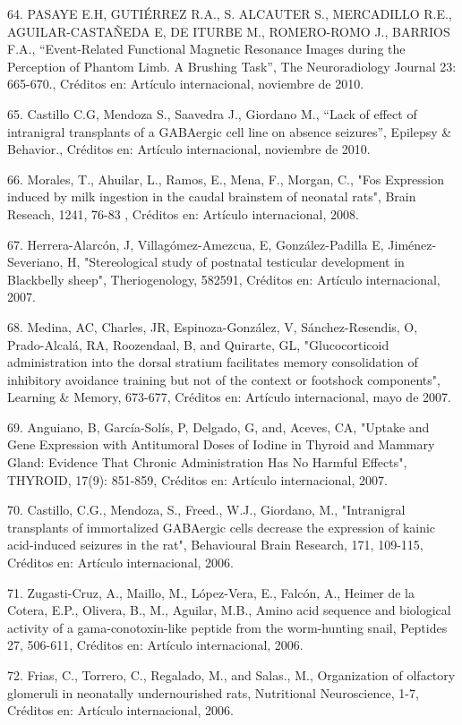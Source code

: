 64. PASAYE E.H, GUTIÉRREZ R.A., S. ALCAUTER S., MERCADILLO R.E., AGUILAR-CASTAÑEDA E, DE ITURBE M., ROMERO-ROMO J., BARRIOS 
F.A., “Event-Related Functional Magnetic Resonance Images during the Perception of Phantom Limb. A Brushing Task”, The 
Neuroradiology Journal 23: 665-670., Créditos en: Artículo internacional, noviembre de 2010.

65. Castillo C.G, Mendoza S., Saavedra J., Giordano M., “Lack of effect of intranigral transplants of a GABAergic cell line on 
absence seizures”, Epilepsy & Behavior., Créditos en: Artículo internacional, noviembre de 2010.

66. Morales, T., Ahuilar, L., Ramos, E., Mena, F., Morgan, C., "Fos Expression induced by milk ingestion in the caudal 
brainstem of neonatal rats", Brain Reseach, 1241, 76-83 , Créditos en: Artículo internacional, 2008.

67. Herrera-Alarcón, J, Villagómez-Amezcua, E, González-Padilla E, Jiménez-Severiano, H, "Stereological study of postnatal 
testicular development in Blackbelly sheep", Theriogenology, 582591, Créditos en: Artículo internacional, 2007.

68. Medina, AC, Charles, JR, Espinoza-González, V, Sánchez-Resendis, O, Prado-Alcalá, RA, Roozendaal, B, and Quirarte, GL, 
"Glucocorticoid administration into the dorsal stratium facilitates memory consolidation of inhibitory avoidance training but 
not of the context or footshock components", Learning & Memory, 673-677, Créditos en: Artículo internacional, mayo de 2007.

69. Anguiano, B, García-Solís, P, Delgado, G, and, Aceves, CA, "Uptake and Gene Expression with Antitumoral Doses of Iodine in 
Thyroid and Mammary Gland: Evidence That Chronic Administration Has No Harmful Effects", THYROID, 17(9): 851-859, Créditos en: 
Artículo internacional, 2007.

70. Castillo, C.G., Mendoza, S., Freed., W.J., Giordano, M., "Intranigral transplants of immortalized GABAergic cells decrease 
the expression of kainic acid-induced seizures in the rat", Behavioural Brain Research, 171, 109-115, Créditos en: Artículo 
internacional, 2006.

71. Zugasti-Cruz, A., Maillo, M., López-Vera, E., Falcón, A., Heimer de la Cotera, E.P., Olivera, B., M., Aguilar, M.B., Amino 
acid sequence and biological activity of a gama-conotoxin-like peptide from the worm-hunting snail, Peptides 27, 506-611, 
Créditos en: Artículo internacional, 2006.

72. Frias, C., Torrero, C., Regalado, M., and Salas., M., Organization of olfactory glomeruli in neonatally undernourished 
rats, Nutritional Neuroscience, 1-7, Créditos en: Artículo internacional, 2006.

